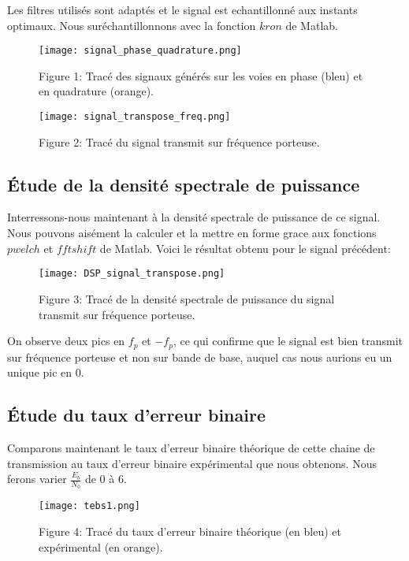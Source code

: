 \documentclass[englishb]{article}
\begin{document}
Les filtres utilisés sont adaptés et le signal est echantillonné aux instants optimaux. Nous suréchantillonnons avec la fonction $kron$ de Matlab. 




\begin{figure}[H]
    \centering
    \texttt{[image: signal\_phase\_quadrature.png]}
    
    Figure 1: Tracé des signaux générés sur les voies en phase (bleu) et en quadrature (orange).
\end{figure}




\begin{figure}[H]
    \centering
    \texttt{[image: signal\_transpose\_freq.png]}
    
    Figure 2: Tracé du signal transmit sur fréquence porteuse.
\end{figure}





\subsection{Étude de la densité spectrale de puissance}
Interressons-nous maintenant à la densité spectrale de puissance de ce signal. Nous pouvons aisément la calculer et la mettre en forme grace aux fonctions $pwelch$ et $fftshift$ de Matlab. Voici le résultat obtenu pour le signal précédent:
\begin{figure}[H]
    \centering
    \texttt{[image: DSP\_signal\_transpose.png]}
    
Figure 3: Tracé de la densité spectrale de puissance du signal transmit sur fréquence porteuse.
\end{figure}

On observe deux pics en $f_p$ et $-f_p$, ce qui confirme que le signal est bien transmit sur fréquence porteuse et non sur bande de base, auquel cas nous aurions eu un unique pic en 0.

\subsection{Étude du taux d'erreur binaire}
Comparons maintenant le taux d'erreur binaire théorique de cette chaine de transmission au taux d'erreur binaire expérimental que nous obtenons. Nous ferons varier $\frac{E_b}{N_0}$ de 0 à 6.
\begin{figure}[H]
    \centering
    \texttt{[image: tebs1.png]}
    
Figure 4: Tracé du taux d'erreur binaire théorique (en bleu) et expérimental (en orange).
\end{figure}
\end{document}

